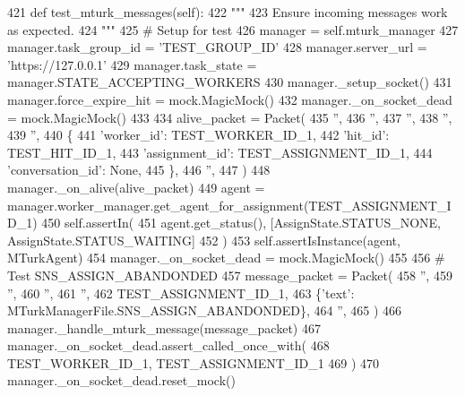 \begin{DoxyCode}
421     \textcolor{keyword}{def }test\_mturk\_messages(self):
422         \textcolor{stringliteral}{"""}
423 \textcolor{stringliteral}{        Ensure incoming messages work as expected.}
424 \textcolor{stringliteral}{        """}
425         \textcolor{comment}{# Setup for test}
426         manager = self.mturk\_manager
427         manager.task\_group\_id = \textcolor{stringliteral}{'TEST\_GROUP\_ID'}
428         manager.server\_url = \textcolor{stringliteral}{'https://127.0.0.1'}
429         manager.task\_state = manager.STATE\_ACCEPTING\_WORKERS
430         manager.\_setup\_socket()
431         manager.force\_expire\_hit = mock.MagicMock()
432         manager.\_on\_socket\_dead = mock.MagicMock()
433 
434         alive\_packet = Packet(
435             \textcolor{stringliteral}{''},
436             \textcolor{stringliteral}{''},
437             \textcolor{stringliteral}{''},
438             \textcolor{stringliteral}{''},
439             \textcolor{stringliteral}{''},
440             \{
441                 \textcolor{stringliteral}{'worker\_id'}: TEST\_WORKER\_ID\_1,
442                 \textcolor{stringliteral}{'hit\_id'}: TEST\_HIT\_ID\_1,
443                 \textcolor{stringliteral}{'assignment\_id'}: TEST\_ASSIGNMENT\_ID\_1,
444                 \textcolor{stringliteral}{'conversation\_id'}: \textcolor{keywordtype}{None},
445             \},
446             \textcolor{stringliteral}{''},
447         )
448         manager.\_on\_alive(alive\_packet)
449         agent = manager.worker\_manager.get\_agent\_for\_assignment(TEST\_ASSIGNMENT\_ID\_1)
450         self.assertIn(
451             agent.get\_status(), [AssignState.STATUS\_NONE, AssignState.STATUS\_WAITING]
452         )
453         self.assertIsInstance(agent, MTurkAgent)
454         manager.\_on\_socket\_dead = mock.MagicMock()
455 
456         \textcolor{comment}{# Test SNS\_ASSIGN\_ABANDONDED}
457         message\_packet = Packet(
458             \textcolor{stringliteral}{''},
459             \textcolor{stringliteral}{''},
460             \textcolor{stringliteral}{''},
461             \textcolor{stringliteral}{''},
462             TEST\_ASSIGNMENT\_ID\_1,
463             \{\textcolor{stringliteral}{'text'}: MTurkManagerFile.SNS\_ASSIGN\_ABANDONDED\},
464             \textcolor{stringliteral}{''},
465         )
466         manager.\_handle\_mturk\_message(message\_packet)
467         manager.\_on\_socket\_dead.assert\_called\_once\_with(
468             TEST\_WORKER\_ID\_1, TEST\_ASSIGNMENT\_ID\_1
469         )
470         manager.\_on\_socket\_dead.reset\_mock()

\end{DoxyCode}
